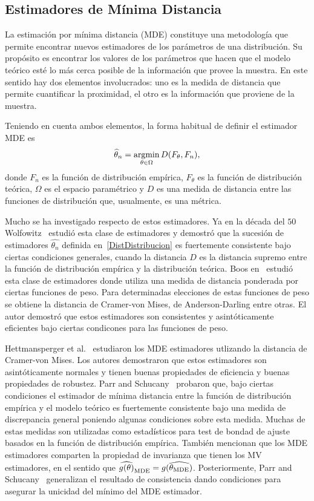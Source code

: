 \subsection{Estimadores de Mínima Distancia}
\label{MDE}

La estimación por mínima distancia (MDE) constituye una metodología que permite encontrar nuevos estimadores de los parámetros de una distribución. Su propósito es encontrar los valores de los parámetros que hacen que el modelo teórico esté lo más cerca posible de la información que provee la muestra. En este sentido hay dos elementos involucrados: uno es la medida de distancia que permite cuantificar la proximidad, el otro es la información que proviene de la muestra. 

Teniendo en cuenta ambos elementos, la forma habitual de definir el estimador MDE es 
\begin{align}
\label{DistDistribucion}
\widehat{\theta}_n=\mathop{\rm argmin}\limits_{\theta\in\Omega} D(F_{\theta},F_n),
\end{align}
donde $F_n$ es la función de distribución empírica, $F_{\theta}$ es la función de distribución teórica, $\Omega$ es el espacio paramétrico y $D$ es una medida de distancia entre las funciones de distribución que, usualmente, es una métrica.

Mucho se ha investigado respecto de estos estimadores. Ya en la década del $50$ Wolfowitz~\cite{wolfowitz1953, wolfowitz1957} estudió esta clase de estimadores y demostró que la sucesión de estimadores ${\widehat{\theta_n}}$ definida en~\eqref{DistDistribucion} es fuertemente consistente bajo ciertas condiciones generales, cuando la distancia $D$ es la distancia supremo entre la función de distribución empírica y la distribución teórica.
Boos en~\cite{Boos1981} estudió esta clase de estimadores donde utiliza una medida de distancia ponderada por ciertas funciones de peso. Para determinadas elecciones de estas funciones de peso se obtiene la distancia de Cramer-von Mises, de Anderson-Darling entre otras. El autor demostró que estos estimadores son consistentes y asintóticamente eficientes bajo ciertas condicones para las funciones de peso.

Hettmansperger et al.~\cite{HettmanSperger1994} estudiaron los MDE estimadores utlizando la distancia de Cramer-von Mises. Los autores demostraron que estos estimadores son asintóticamente normales y tienen buenas propiedades de eficiencia y buenas propiedades de robustez. Parr and Schucany~\cite{Parr1980} probaron que, bajo ciertas condiciones el estimador de mínima distancia entre la función de distribución empírica y el modelo teórico es fuertemente consistente bajo una medida de discrepancia general poniendo algunas condiciones sobre esta medida. Muchas de estas medidas son utilizadas como estadísticos para test de bondad de ajuste basados en la función de distribución empírica. También mencionan que los MDE estimadores comparten la propiedad de invarianza que tienen los MV estimadores, en el sentido que $\widehat{g(\theta)}_{\tiny{\text{MDE}}}=g(\widehat{\theta_{\tiny{\text{MDE}}}})$. Posteriormente, Parr and Schucany~\cite{parr1982} generalizan el resultado de consistencia dando condiciones para asegurar la unicidad del mínimo del MDE estimador.

